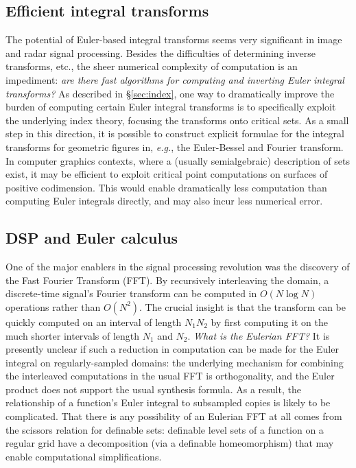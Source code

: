 \documentclass{psapm-l}
\theoremstyle{definition}
\theoremstyle{remark}
\numberwithin{equation}{section}
\begin{document}
\subsection{Efficient integral transforms}
The potential of Euler-based integral transforms seems very significant in image and radar signal processing. Besides the difficulties of determining inverse transforms, etc., the sheer numerical complexity of computation is an impediment: {\em are there fast algorithms for computing and inverting Euler integral transforms?} As described in \S\ref{sec:index}, one way to dramatically improve the burden of computing certain Euler integral transforms is to specifically exploit the underlying index theory, focusing the transforms onto critical sets. As a small step in this direction, it is possible to construct explicit formulae for the integral transforms for geometric figures in, {{\em e.g.}}, the Euler-Bessel and Fourier transform. In computer graphics contexts, where a (usually semialgebraic) description of sets exist, it may be efficient to exploit critical point computations on surfaces of positive codimension.  This would enable dramatically less computation than computing Euler integrals directly, and may also incur less numerical error.

\subsection{DSP and Euler calculus}
One of the major enablers in the signal processing revolution was the discovery of the Fast Fourier Transform (FFT).  By recursively interleaving the domain, a discrete-time signal's Fourier transform can be computed in $O(N \log N)$ operations rather than $O(N^2)$.  The crucial insight is that the transform can be quickly computed on an interval of length $N_1 N_2$ by first computing it on the much shorter intervals of length $N_1$ and $N_2$. {\em What is the Eulerian FFT?} It is presently unclear if such a reduction in computation can be made for the Euler integral on regularly-sampled domains: the underlying mechanism for combining the interleaved computations in the usual FFT is orthogonality, and the Euler product does not support the usual synthesis formula.  As a result, the relationship of a function's Euler integral to subsampled copies is likely to be complicated. That there is any possibility of an Eulerian FFT at all comes from the scissors relation for definable sets: definable level sets of a function on a regular grid have a decomposition (via a definable homeomorphism) that may enable computational simplifications.
\end{document}
